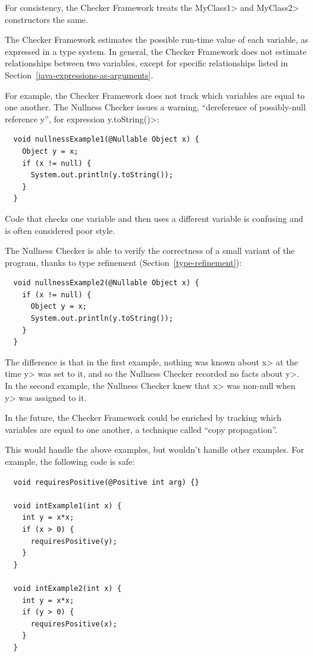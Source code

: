 For consistency, the Checker Framework treats the \<MyClass1> and
\<MyClass2> constructors the same.



The Checker Framework estimates the possible run-time value of each
variable, as expressed in a type system.  In general, the Checker Framework
does not estimate relationships between two variables, except for specific
relationships listed in Section~\ref{java-expressions-as-arguments}.

For example, the Checker Framework does not track which variables are equal
to one another.  The Nullness Checker issues a warning, ``dereference of
possibly-null reference y'', for expression \<y.toString()>:

\begin{Verbatim}
  void nullnessExample1(@Nullable Object x) {
    Object y = x;
    if (x != null) {
      System.out.println(y.toString());
    }
  }
\end{Verbatim}

\noindent
Code that checks one variable and then uses a different variable is
confusing and is often considered poor style.

The Nullness Checker is able to verify the correctness of a small variant
of the program, thanks to type refinement
(Section~\ref{type-refinement}):

\begin{Verbatim}
  void nullnessExample2(@Nullable Object x) {
    if (x != null) {
      Object y = x;
      System.out.println(y.toString());
    }
  }
\end{Verbatim}

The difference is that in the first example, nothing was known about \<x> at
the time \<y> was set to it, and so the Nullness Checker recorded no facts
about \<y>.  In the second example, the Nullness Checker knew that \<x>
was non-null when \<y> was assigned to it.

In the future, the Checker Framework could be enriched by tracking which
variables are equal to one another, a technique called ``copy
propagation''.

This would handle the above examples, but wouldn't handle other examples.
For example, the following code is safe:

\begin{Verbatim}
  void requiresPositive(@Positive int arg) {}

  void intExample1(int x) {
    int y = x*x;
    if (x > 0) {
      requiresPositive(y);
    }
  }

  void intExample2(int x) {
    int y = x*x;
    if (y > 0) {
      requiresPositive(x);
    }
  }
\end{Verbatim}

